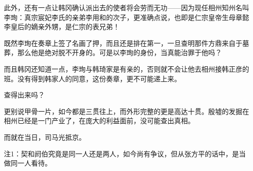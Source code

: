 此外，还有一点让韩冈确认派出去的使者将会劳而无功——因为现任相州知州名叫李珣：真宗宸妃李氏的亲弟李用和的次子，更准确点说，也即是仁宗皇帝生母章懿李皇后的嫡亲外甥，是仁宗的表兄弟！

既然李珣在奏章上签了名画了押，而且还是排在第一，一旦查明那件方鼎来自于墓葬，那么他是绝对脱不开身的。可是以李珣的身份，当真能治罪于他吗？

而且韩冈还知道一点，李珣与韩琦家是有亲的，否则就不会让他去相州接韩正彦的班。没有得到韩家人的同意，这份奏章，更不可能递上来。

查得出来吗？

更别说甲骨一片，如今都是三贯往上，而外形完整的更是高达十贯。殷墟的发掘在相州已经是一门产业了，在庞大的利益面前，没可能查出真相。

而就在当日，司马光抵京。

注1：契和阏伯究竟是同一人还是两人，如今尚有争议，但从张方平的话中，是当做同一人看待。
